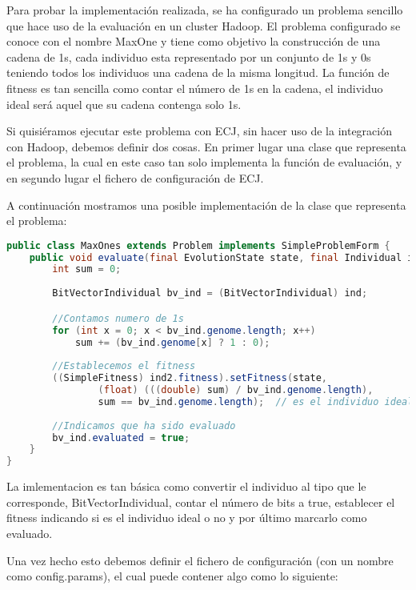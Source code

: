 Para probar la implementación realizada, se ha configurado un problema sencillo que hace uso de la evaluación en un cluster Hadoop. El problema configurado se conoce con el nombre MaxOne y tiene como objetivo la construcción de una cadena de 1s, cada individuo esta representado por un conjunto de 1s y 0s teniendo todos los individuos una cadena de la misma longitud. La función de fitness es tan sencilla como contar el n\'umero de 1s en la cadena, el individuo ideal ser\'a aquel que su cadena contenga solo 1s.

Si quisiéramos ejecutar este problema con ECJ, sin hacer uso de la integración con Hadoop, debemos definir dos cosas. En primer lugar una clase que representa el problema, la cual en este caso tan solo implementa la función de evaluación, y en segundo lugar el fichero de configuración de ECJ.

A continuación mostramos una posible implementación de la clase que representa el problema:

\begin{lstlisting}[language=Java]
public class MaxOnes extends Problem implements SimpleProblemForm {
	public void evaluate(final EvolutionState state, final Individual ind, final int subpopulation, final int threadnum) {
		int sum = 0;
		
		BitVectorIndividual bv_ind = (BitVectorIndividual) ind;

		//Contamos numero de 1s
		for (int x = 0; x < bv_ind.genome.length; x++)
			sum += (bv_ind.genome[x] ? 1 : 0);
		
		//Establecemos el fitness
		((SimpleFitness) ind2.fitness).setFitness(state,
				(float) (((double) sum) / bv_ind.genome.length),
				sum == bv_ind.genome.length);  // es el individuo ideal?
		
		//Indicamos que ha sido evaluado
		bv_ind.evaluated = true;
	}
}
\end{lstlisting}

La imlementacion es tan b\'asica como convertir el individuo al tipo que le corresponde, BitVectorIndividual, contar el n\'umero de bits a true, establecer el fitness indicando si es el individuo ideal o no y por \'ultimo marcarlo como evaluado.

Una vez hecho esto debemos definir el fichero de configuración (con un nombre como config.params), el cual puede contener algo como lo siguiente:

